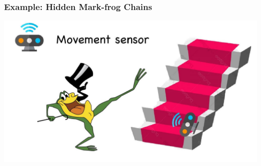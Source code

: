 \documentclass[xcolor=dvipsnames, compress]{beamer}
\begin{document}
\begin{frame}
\frametitle{Example: Hidden Mark-frog Chains}
\begin{center}
	\includegraphics[width=1.0\textwidth]{images/frog_ladder.jpg}
\end{center}

\end{frame}
\end{document}
